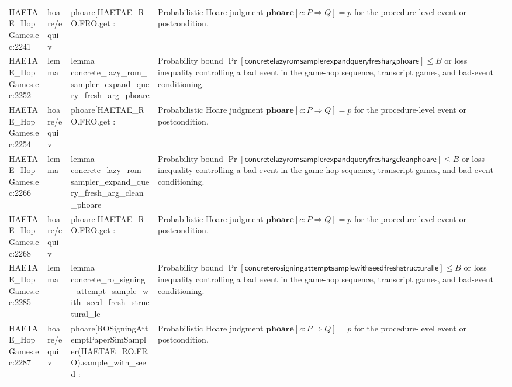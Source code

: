 \documentclass[10pt]{article}
\begin{document}
\begin{longtable}{L{0.11\textwidth}L{0.055\textwidth}L{0.385\textwidth}L{0.41\textwidth}}
HAETAE\_\allowbreak{}HopGames.\allowbreak{}ec:\allowbreak{}2241 & hoare/equiv & {\ttfamily\scriptsize phoare[HAETAE\_\allowbreak{}RO.FRO.get :} & Probabilistic Hoare judgment $\mathbf{phoare}[c:P\Rightarrow Q]=p$ for the procedure-level event or postcondition. \\
HAETAE\_\allowbreak{}HopGames.\allowbreak{}ec:\allowbreak{}2252 & lemma & {\ttfamily\scriptsize lemma concrete\_\allowbreak{}lazy\_\allowbreak{}rom\_\allowbreak{}sampler\_\allowbreak{}expand\_\allowbreak{}query\_\allowbreak{}fresh\_\allowbreak{}arg\_\allowbreak{}phoare} & Probability bound $\Pr[\mathsf{concretelazyromsamplerexpandqueryfreshargphoare}]\le B$ or loss inequality controlling a bad event in the game-hop sequence, transcript games, and bad-event conditioning. \\
HAETAE\_\allowbreak{}HopGames.\allowbreak{}ec:\allowbreak{}2254 & hoare/equiv & {\ttfamily\scriptsize phoare[HAETAE\_\allowbreak{}RO.FRO.get :} & Probabilistic Hoare judgment $\mathbf{phoare}[c:P\Rightarrow Q]=p$ for the procedure-level event or postcondition. \\
HAETAE\_\allowbreak{}HopGames.\allowbreak{}ec:\allowbreak{}2266 & lemma & {\ttfamily\scriptsize lemma concrete\_\allowbreak{}lazy\_\allowbreak{}rom\_\allowbreak{}sampler\_\allowbreak{}expand\_\allowbreak{}query\_\allowbreak{}fresh\_\allowbreak{}arg\_\allowbreak{}clean\_\allowbreak{}phoare} & Probability bound $\Pr[\mathsf{concretelazyromsamplerexpandqueryfreshargcleanphoare}]\le B$ or loss inequality controlling a bad event in the game-hop sequence, transcript games, and bad-event conditioning. \\
HAETAE\_\allowbreak{}HopGames.\allowbreak{}ec:\allowbreak{}2268 & hoare/equiv & {\ttfamily\scriptsize phoare[HAETAE\_\allowbreak{}RO.FRO.get :} & Probabilistic Hoare judgment $\mathbf{phoare}[c:P\Rightarrow Q]=p$ for the procedure-level event or postcondition. \\
HAETAE\_\allowbreak{}HopGames.\allowbreak{}ec:\allowbreak{}2285 & lemma & {\ttfamily\scriptsize lemma concrete\_\allowbreak{}ro\_\allowbreak{}signing\_\allowbreak{}attempt\_\allowbreak{}sample\_\allowbreak{}with\_\allowbreak{}seed\_\allowbreak{}fresh\_\allowbreak{}structural\_\allowbreak{}le} & Probability bound $\Pr[\mathsf{concreterosigningattemptsamplewithseedfreshstructuralle}]\le B$ or loss inequality controlling a bad event in the game-hop sequence, transcript games, and bad-event conditioning. \\
HAETAE\_\allowbreak{}HopGames.\allowbreak{}ec:\allowbreak{}2287 & hoare/equiv & {\ttfamily\scriptsize phoare[ROSigningAttemptPaperSimSampler(HAETAE\_\allowbreak{}RO.FRO).sample\_\allowbreak{}with\_\allowbreak{}seed :} & Probabilistic Hoare judgment $\mathbf{phoare}[c:P\Rightarrow Q]=p$ for the procedure-level event or postcondition. \\

\end{longtable}
\end{document}
